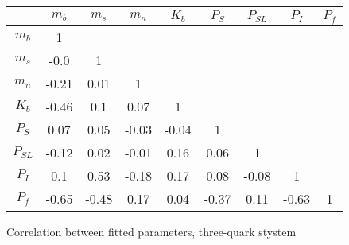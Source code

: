 \begin{tabular}{c  c  c  c  c  c  c  c  c}\hline \hline
         &  $m_{b}$       &     $m_{s}$    &    $m_{n}$  &      $K_b$    & $P_S$ & $P_{SL}$ & $P_I$ & $P_f$ \\ \hline
 $m_{b}$ &     1   &   &   &   &    &   &   &  \\ 
 $m_{s}$ & -0.0 &  1   &   &   &   &   &   &  \\ 
 $m_{n}$ & -0.21 & 0.01 &  1   &   &   &   &   & \\ 
 $K_b$   & -0.46 & 0.1 & 0.07 &  1   &   &   &   &   \\ 
 $P_S$   & 0.07 & 0.05 & -0.03 & -0.04 & 1 &   &   & \\ 
 $P_{SL}$& -0.12 & 0.02 & -0.01 & 0.16 & 0.06 & 1  &   & \\ 
 $P_I$   & 0.1 & 0.53 & -0.18 & 0.17 & 0.08 & -0.08 & 1  &  \\ 
 $P_f$   & -0.65 & -0.48 & 0.17 & 0.04 & -0.37 & 0.11 & -0.63 & 1 \\ \hline \hline
\end{tabular}
\caption{Correlation between fitted parameters, three-quark stystem }
\label{tab:3quark_corr}
